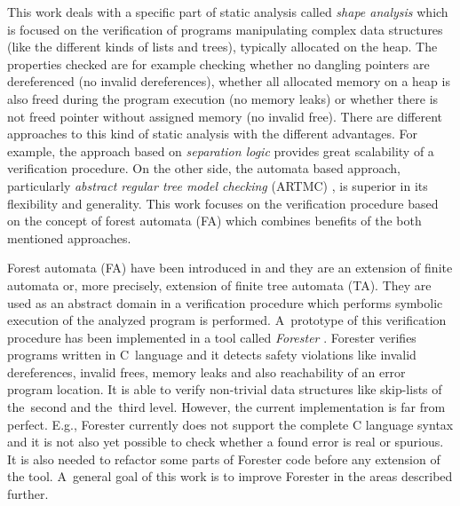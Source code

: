 This work deals with a specific part of static analysis called \emph{shape analysis} which is focused on the verification of programs manipulating
complex data structures (like the different kinds of lists and trees), typically allocated on the heap.
The properties checked are for example checking whether no dangling
pointers are dereferenced (no invalid dereferences), whether all allocated memory on a heap is also freed
during the program execution (no memory leaks) or whether there is not freed pointer without assigned memory (no invalid free).
There are different approaches to this kind of static analysis with the different advantages.
For example, the approach based on \emph{separation logic} \cite{seplog,seplog07} provides great scalability of a verification procedure.
On the other side, the automata based approach, particularly \emph{abstract regular tree model checking} (ARTMC) \cite{artmc}, is
superior in its flexibility and generality.
This work focuses on the verification procedure based on the concept of forest automata (FA) which
combines benefits of the both mentioned approaches.

Forest automata (FA) have been introduced in \cite{forester11} and
they are an extension of finite automata or, more precisely, extension of finite tree automata (TA).
They are used as an abstract domain in a verification procedure which performs symbolic execution of the analyzed program is performed.
A~prototype of this verification procedure has been implemented in a tool called \emph{Forester} \cite{www:forester}.
Forester verifies programs written in C~language and it detects safety violations like invalid dereferences, invalid frees,
memory leaks and also reachability of an error program location.
It is able to verify non-trivial data structures like skip-lists of the~second and the~third level.
However, the current implementation is far from perfect.
E.g., Forester currently does not support the complete C language syntax and %
it is not also yet possible to check whether a found error is real or spurious.
It is also needed to refactor some parts of Forester code before any extension of the tool.
A~general goal of this work is to improve Forester in the areas described further.

